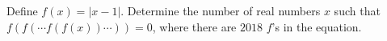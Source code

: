 Define $f(x) = |x-1|$. Determine the number of real numbers $x$ such that $f(f(\cdots f(f(x))\cdots )) = 0$, where there are $2018$ $f$'s in the equation.
